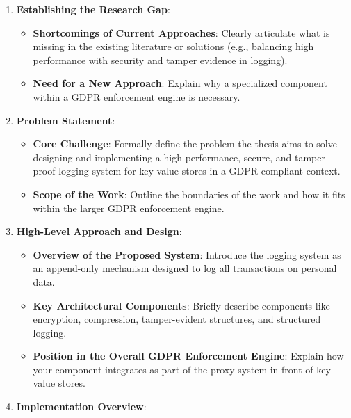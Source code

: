 \begin{enumerate}
        \item \textbf{Establishing the Research Gap}:
              \begin{itemize}
                      \item \textbf{Shortcomings of Current Approaches}:
                            Clearly articulate what is missing in the existing literature or solutions (e.g., balancing high performance with security and tamper evidence in logging).
                      \item \textbf{Need for a New Approach}:
                            Explain why a specialized component within a GDPR enforcement engine is necessary.
              \end{itemize}
        \item \textbf{Problem Statement}:
              \begin{itemize}
                      \item \textbf{Core Challenge}:
                            Formally define the problem the thesis aims to solve - designing and implementing a high-performance, secure, and tamper-proof logging system for key-value stores in a GDPR-compliant context.
                      \item \textbf{Scope of the Work}:
                            Outline the boundaries of the work and how it fits within the larger GDPR enforcement engine.
              \end{itemize}
        \item \textbf{High-Level Approach and Design}:
              \begin{itemize}
                      \item \textbf{Overview of the Proposed System}:
                            Introduce the logging system as an append-only mechanism designed to log all transactions on personal data.
                      \item \textbf{Key Architectural Components}:
                            Briefly describe components like encryption, compression, tamper-evident structures, and structured logging.
                      \item \textbf{Position in the Overall GDPR Enforcement Engine}:
                            Explain how your component integrates as part of the proxy system in front of key-value stores.
              \end{itemize}
        \item \textbf{Implementation Overview}:
              \begin{itemize}

\end{itemize}
\end{enumerate}
